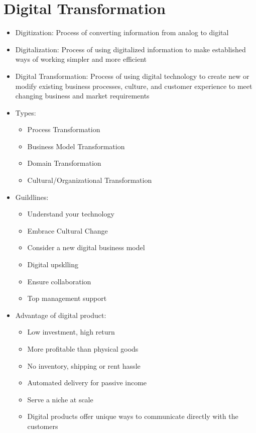 \documentclass[openany,12pt,a4paper]{book}
\begin{document}
\section{Digital Transformation}
\begin{itemize}
    \item Digitization: Process of converting information from analog to digital
    \item Digitalization: Process of using digitalized information to make established ways of working simpler and more efficient
    \item Digital Transformation: Process of using digital technology to create new or modify existing business processes, culture, and customer experience to meet changing business and market requirements
    \item Types:
    \begin{itemize}
        \item Process Transformation
        \item Business Model Transformation
        \item Domain Transformation
        \item Cultural/Organizational Transformation
    \end{itemize}
    \item Guildlines:
    \begin{itemize}
        \item Understand your technology
        \item Embrace Cultural Change
        \item Consider a new digital business model
        \item Digital upsklling
        \item Ensure collaboration
        \item Top management support
    \end{itemize}
    \item Advantage of digital product:
    \begin{itemize}
        \item Low investment, high return
        \item More profitable than physical goods
        \item No inventory, shipping or rent hassle
        \item Automated delivery for passive income
        \item Serve a niche at scale
        \item Digital products offer unique ways to communicate directly with the customers
    \end{itemize}
\end{itemize}
\end{document}
